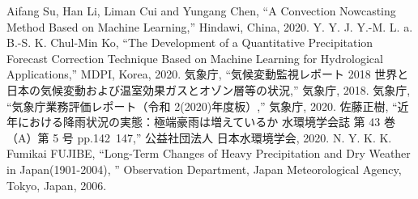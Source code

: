\begin{thebibliography}{99}
 Aifang Su, Han Li, Liman Cui and Yungang Chen, “A Convection Nowcasting Method Based on Machine Learning,” Hindawi, China, 2020.
 Y. Y. J. Y.-M. L. a. B.-S. K. Chul-Min Ko, “The Development of a Quantitative Precipitation Forecast Correction Technique Based on Machine Learning for Hydrological Applications,” MDPI, Korea, 2020.
 気象庁, “気候変動監視レポート 2018 世界と日本の気候変動および温室効果ガスとオゾン層等の状況,” 気象庁, 2018.
 気象庁, “気象庁業務評価レポート（令和 2(2020)年度板）,” 気象庁, 2020.
 佐藤正樹, “近年における降雨状況の実態：極端豪雨は増えているか 水環境学会誌 第 43 巻（A）第 5 号 pp.142~147,” 公益社団法人 日本水環境学会, 2020.
 N. Y. K. K. Fumikai FUJIBE, “Long-Term Changes of Heavy Precipitation and Dry Weather in Japan(1901-2004), ” Observation Department, Japan Meteorological Agency, Tokyo, Japan, 2006.
\end{thebibliography}
